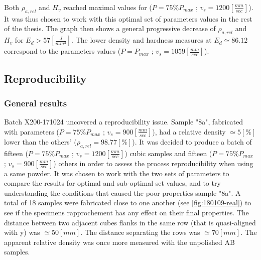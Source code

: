 Both $\rho_{a,rel}$ and $H_v$ reached maximal values for ($P=75\% P_{max}$ ; $v_s=1200 [\frac{mm}{sec}]$). It was thus chosen to work with this optimal set of parameters values in the rest of the thesis. The graph then shows a general progressive decrease of  $\rho_{a,rel}$ and $H_v$ for $E_d>57 [\frac{J}{mm^3}]$. The lower density and hardness measures at $E_d \simeq 86.12$ correspond to the parameters values ($P=P_{max}$ ; $v_s=1059 [\frac{mm}{sec}]$).


\subsection{Reproducibility}
\label{RReprod}
\subsubsection{General results}
Batch X200-171024 uncovered a reproducibility issue. Sample "8a", fabricated with parameters ($P=75\% P_{max}$ ; $v_s=900 [\frac{mm}{sec}]$), had a relative density $\simeq 5 [\%]$ lower than the others' ($\rho_{a,rel}=98.77[\%]$). It was decided to produce a batch of fifteen ($P=75\% P_{max}$ ; $v_s=1200 [\frac{mm}{sec}]$) cubic samples and fifteen ($P=75\% P_{max}$ ; $v_s=900 [\frac{mm}{sec}]$) others in order to assess the process reproducibility when using a same powder. It was chosen to work with the two sets of parameters to compare the results for optimal and sub-optimal set values, and to try understanding the conditions that caused the poor properties sample "8a". A total of 18 samples were fabricated close to one another (see \ref{fig:180109-real}) to see if the specimens rapprochement has any effect on their final properties. The distance between two adjacent cubes flanks in the same row (that is quasi-aligned with y) was $\simeq 50 [mm]$. The distance separating the rows was $\simeq 70 [mm]$. The apparent relative density was once more measured with the unpolished AB samples.\\

